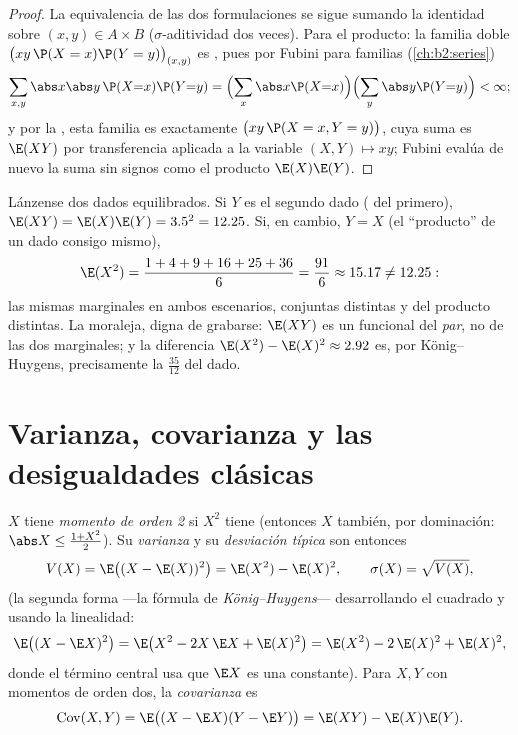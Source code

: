 \begin{proof}
La equivalencia de las dos formulaciones se sigue sumando la
identidad  sobre $(x, y) \in A \times B$ ($\sigma$-aditividad
dos veces). Para el producto: la familia doble $\bigl(xy\,\P(X =
x)\P(Y = y)\bigr)_{(x,y)}$ es , pues por Fubini para familias
(\cref{ch:b2:series})
\[
\sum_{x, y}\abs x \abs y\,\P(X{=}x)\P(Y{=}y)
= \Bigl(\sum_x \abs x \P(X{=}x)\Bigr)
\Bigl(\sum_y \abs y \P(Y{=}y)\Bigr) < \infty ;
\]
y por la , esta familia es exactamente $\bigl(xy\,\P(X =
x, Y = y)\bigr)$, cuya suma es $\E(XY)$ por transferencia aplicada a
la variable $(X, Y) \mapsto xy$; Fubini evalúa de nuevo la suma sin
signos como el producto $\E(X)\E(Y)$.
\end{proof}

\begin{example}\label{ex:b2:randomvar:productcontrast}
Lánzense dos dados equilibrados. Si $Y$ es el segundo dado
( del primero), $\E(XY) = \E(X)\E(Y) = 3.5^2 = 12.25$.
Si, en cambio, $Y = X$ (el ``producto'' de un dado consigo mismo),
\[
\E(X^2) = \frac{1 + 4 + 9 + 16 + 25 + 36}{6} = \frac{91}{6}
\approx 15.17 \neq 12.25 :
\]
las mismas  marginales en ambos escenarios,  conjuntas
distintas y  del producto distintas. La moraleja, digna
de grabarse: $\E(XY)$ es un funcional del \emph{par}, no de las dos
marginales; y la diferencia $\E(X^2) - \E(X)^2 \approx 2.92$ es, por
König--Huygens, precisamente la  $\frac{35}{12}$ del dado.
\end{example}

\section{Varianza, covarianza y las desigualdades clásicas}

\begin{definition}\label{def:b2:randomvar:variance}
$X$ tiene \emph{momento de orden 2} si $X^2$ tiene 
(entonces $X$ también, por dominación: $\abs X \leq \frac{1 +
X^2}{2}$). Su \emph{varianza} y su \emph{desviación
típica} son entonces
\[
V(X) = \E\bigl((X - \E(X))^2\bigr)
= \E(X^2) - \E(X)^2 ,
\qquad
\sigma(X) = \sqrt{V(X)} ,
\]
(la segunda forma ---la fórmula de \emph{König--Huygens}---
desarrollando el cuadrado y usando la linealidad:
\[
\E\bigl((X - \E X)^2\bigr)
= \E\bigl(X^2 - 2X\,\E X + \E(X)^2\bigr)
= \E(X^2) - 2\,\E(X)^2 + \E(X)^2 ,
\]
donde el término central usa que $\E X$ es una constante). Para $X,
Y$ con momentos de orden dos, la \emph{covarianza}
es
\[
\operatorname{Cov}(X, Y)
= \E\bigl((X - \E X)(Y - \E Y)\bigr)
= \E(XY) - \E(X)\E(Y) .
\]
\end{definition}

